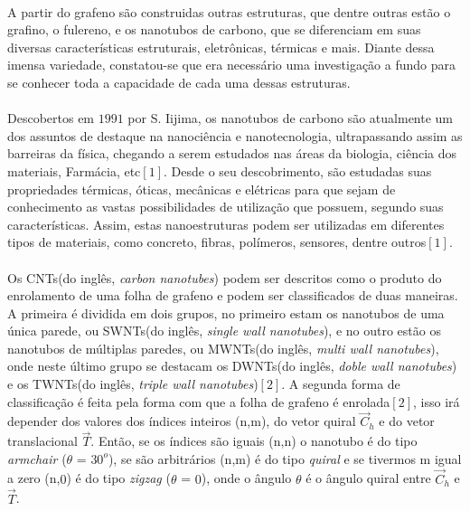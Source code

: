 \documentclass[12pt,a4paper]{report}
\begin{document}
\paragraph{}
A partir do grafeno são construidas outras estruturas, que dentre outras estão o grafino, o fulereno, e os nanotubos de carbono, que se diferenciam em suas diversas características estruturais, eletrônicas, térmicas e mais. Diante dessa imensa variedade, constatou-se que era necessário uma investigação a fundo para se conhecer toda a capacidade de cada uma dessas estruturas.
\paragraph{} Descobertos em $1991$ por S. Iijima, os nanotubos de carbono são atualmente um dos assuntos de destaque na nanociência e nanotecnologia, ultrapassando assim as barreiras da física, chegando a serem estudados nas áreas da biologia, ciência dos materiais, Farmácia, etc$[1]$. Desde o seu descobrimento, são estudadas suas propriedades térmicas, óticas, mecânicas e elétricas para que sejam de conhecimento as vastas possibilidades de utilização que possuem, segundo suas características. Assim, estas nanoestruturas podem ser utilizadas em diferentes tipos de materiais, como concreto, fibras, polímeros, sensores, dentre outros$[1]$. 
\paragraph{} Os CNTs(do inglês, \textit{carbon nanotubes}) podem ser descritos como o produto do enrolamento de uma folha de grafeno e podem ser classificados de duas maneiras. A primeira é dividida em dois grupos, no primeiro estam os nanotubos de uma única parede, ou SWNTs(do inglês, \textit{single wall nanotubes}), e no outro estão os nanotubos de múltiplas paredes, ou MWNTs(do inglês, \textit{multi wall nanotubes}), onde neste último grupo se destacam os DWNTs(do inglês, \textit{doble wall nanotubes}) e os TWNTs(do inglês, \textit{triple wall nanotubes})$[2]$. A segunda forma de classificação é feita pela forma com que a folha de grafeno é enrolada$[2]$, isso irá depender dos valores dos índices inteiros (n,m), do vetor quiral $\vec{C}_h$ e do vetor translacional $\vec{T}$. Então, se os índices são iguais (n,n) o nanotubo é do tipo \textit{armchair} (\textit{$\theta$} = $30^{o}$), se são arbitrários (n,m) é do tipo \textit{quiral}  e se tivermos m igual a zero (n,$0$) é do tipo \textit{zigzag} (\textit{$\theta$} = $0$), onde o ângulo $\theta$ é o ângulo quiral entre $\vec{C}_h$ e $\vec{T}$.
\end{document}
